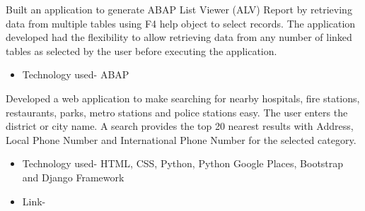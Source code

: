 \documentclass[9.5pt,a4paper]{altacv}
\begin{document}
\tagline{}

\begin{fullwidth}
\makecvheader
\end{fullwidth}


Built an application to generate ABAP List Viewer (ALV) Report by retrieving data from multiple tables using F4 help object to select records. The application developed had the flexibility to allow retrieving data from any number of linked tables as selected by the user before executing the application.
\begin{itemize}
\item Technology used- ABAP
\end{itemize}

\divider

Developed a web application to make searching for nearby hospitals, fire stations, restaurants, parks, metro stations and police stations easy. The user enters the district or city name. A search provides the top 20 nearest results with Address, Local Phone Number and International Phone Number for the selected category.
\begin{itemize}
\item Technology used- HTML, CSS, Python, Python Google Places, Bootstrap and Django Framework
\item Link- \href{https://find-my-perfect-place.herokuapp.com/}{}
\end{itemize}
\end{document}
